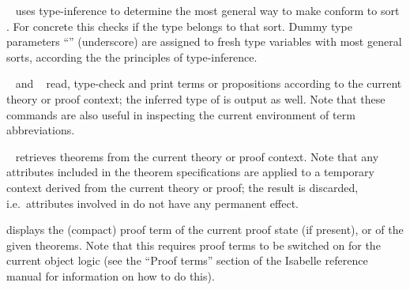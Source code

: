 \begin{isabellebody}
\begin{isamarkuptext}
\begin{description}
  \item \hyperlink{command.typ}{\mbox{}}~ uses type-inference to
  determine the most general way to make  conform to sort
  .  For concrete  this checks if the type
  belongs to that sort.  Dummy type parameters ``''
  (underscore) are assigned to fresh type variables with most general
  sorts, according the the principles of type-inference.

  \item \hyperlink{command.term}{\mbox{}}~ and \hyperlink{command.prop}{\mbox{}}~
  read, type-check and print terms or propositions according to the
  current theory or proof context; the inferred type of  is
  output as well.  Note that these commands are also useful in
  inspecting the current environment of term abbreviations.

  \item \hyperlink{command.thm}{\mbox{}}~ retrieves
  theorems from the current theory or proof context.  Note that any
  attributes included in the theorem specifications are applied to a
  temporary context derived from the current theory or proof; the
  result is discarded, i.e.\ attributes involved in  do not have any permanent effect.

  \item \hyperlink{command.prf}{\mbox{}} displays the (compact) proof term of the
  current proof state (if present), or of the given theorems. Note
  that this requires proof terms to be switched on for the current
  object logic (see the ``Proof terms'' section of the Isabelle
  reference manual for information on how to do this).


\end{description}
\end{isamarkuptext}
\end{isabellebody}
